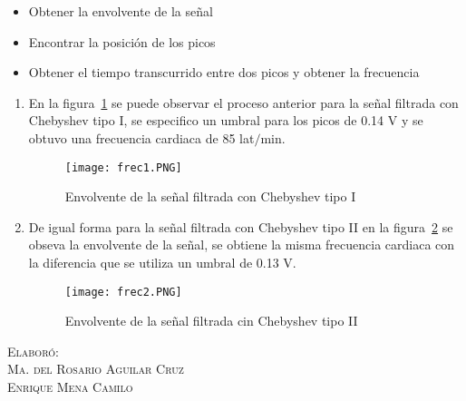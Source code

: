 \documentclass[10pt,letterpaper,spanish,twoside]{report}
\begin{document}
\begin{enumerate}
 \begin{itemize}
 	\item Obtener la envolvente de la señal 
 	\item Encontrar la posición de los picos
 	\item Obtener el tiempo transcurrido entre dos picos y obtener la frecuencia
 \end{itemize}
 \begin{enumerate}
 	\item En la figura~\ref{contexto:Frec1} se puede observar el proceso anterior para la señal filtrada con Chebyshev tipo I, se especifico un umbral para los picos de 0.14 V y se obtuvo una frecuencia cardiaca de 85 lat$/$min.
 	\begin{figure}[H]
 		\centering
	 	\texttt{[image: frec1.PNG]}
 		\caption{Envolvente de la señal filtrada con Chebyshev tipo I}
	 	\label{contexto:Frec1}
 	\end{figure}
 	\item De igual forma para la señal filtrada con Chebyshev tipo II en la figura~\ref{contexto:Frec2} se obseva la envolvente de la señal, se obtiene la misma frecuencia cardiaca con la diferencia que se utiliza un umbral de 0.13 V.
 	\begin{figure}[H]
 		\centering
 		\texttt{[image: frec2.PNG]}
 		\caption{Envolvente de la señal filtrada cin Chebyshev tipo II}
 		\label{contexto:Frec2}
 	\end{figure}
 \end{enumerate}
\end{enumerate}

\vfill
\begin{flushright}
\textsc{Elaboró:\\
Ma. del Rosario Aguilar Cruz\\
Enrique Mena Camilo}
\end{flushright}
\end{document}
